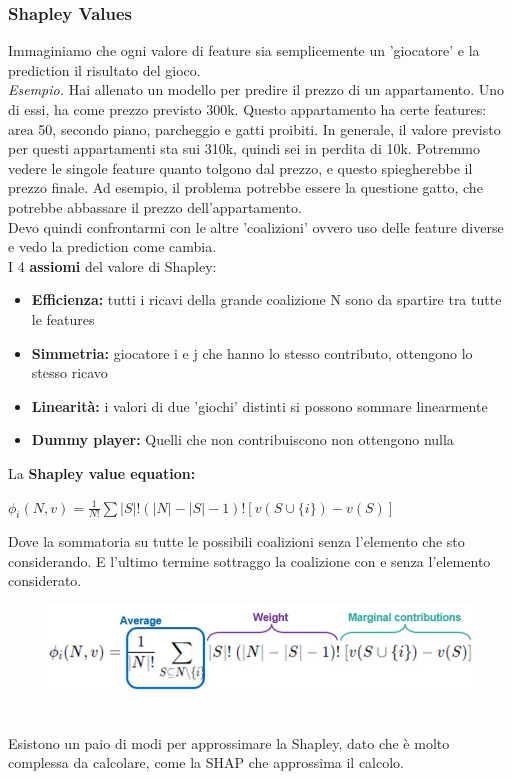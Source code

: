 \subsubsection{Shapley Values}
Immaginiamo che ogni valore di feature sia semplicemente un 'giocatore' e la prediction il risultato del gioco. 
\\
\textit{Esempio.} Hai allenato un modello per predire il prezzo di un appartamento. Uno di essi, ha come prezzo previsto 300k. Questo appartamento ha certe features: area 50, secondo piano, parcheggio e gatti proibiti. In generale, il valore previsto per questi appartamenti sta sui 310k, quindi sei in perdita di 10k. Potremmo vedere le singole feature quanto tolgono dal prezzo, e questo spiegherebbe il prezzo finale. Ad esempio, il problema potrebbe essere la questione gatto, che potrebbe abbassare il prezzo dell'appartamento. 
\\
Devo quindi confrontarmi con le altre 'coalizioni' ovvero uso delle feature diverse e vedo la prediction come cambia. 
\\
I 4 \textbf{assiomi} del valore di Shapley:
\begin{itemize}
    \item \textbf{Efficienza:} tutti i ricavi della grande coalizione N sono da spartire tra tutte le features
    \item \textbf{Simmetria:} giocatore i e j che hanno lo stesso contributo, ottengono lo stesso ricavo 
    \item \textbf{Linearità:} i valori di due 'giochi' distinti si possono sommare linearmente
    \item \textbf{Dummy player:} Quelli che non contribuiscono non ottengono nulla 
\end{itemize}

\newpage

La \textbf{Shapley value equation:}
\begin{center}
    \begin{math}
        \phi_i(N,v) = \frac{1}{N!} \sum |S|!(|N|-|S|-1)! [v(S \cup \{ i\}) -v(S)]
    \end{math}
\end{center}
Dove la sommatoria su tutte le possibili coalizioni senza l'elemento che sto considerando. E l'ultimo termine sottraggo la coalizione con e senza l'elemento considerato. 
\\
\begin{figure}[th]
    \centering
    \includegraphics[scale=0.5]{ExplainableAI/img/shapley function.png}
\end{figure}
\\
Esistono un paio di modi per approssimare la Shapley, dato che è molto complessa da calcolare, come la SHAP che approssima il calcolo. 

